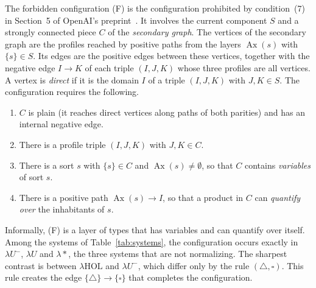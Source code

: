 \documentclass[10pt]{article}
\newcommand{\Ax}{\operatorname{Ax}}
\begin{document}
The forbidden configuration (F) is the configuration prohibited by condition~(7) in
Section~5 of OpenAI's preprint~\cite{OpenAI2026}. It involves the current component
$S$ and a strongly connected piece $C$ of the \emph{secondary graph}. The vertices of
the secondary graph are the profiles reached by positive paths from the layers
$\Ax(s)$ with $\{s\}\in S$. Its edges are the positive edges between these vertices,
together with the negative edge $I\to K$ of each triple $(I,J,K)$ whose three
profiles are all vertices. A vertex is \emph{direct} if it is the domain $I$ of a
triple $(I,J,K)$ with $J,K\in S$. The configuration requires the following.
\begin{enumerate}[label=(\alph*)]
\item $C$ is plain (it reaches direct vertices along paths of both parities) and
  has an internal negative edge.
\item There is a profile triple $(I,J,K)$ with $J,K\in C$.
\item There is a sort $s$ with $\{s\}\in C$ and $\Ax(s)\neq\emptyset$, so that $C$
  contains \emph{variables} of sort $s$.
\item There is a positive path $\Ax(s)\to I$, so that a product in $C$ can
  \emph{quantify over} the inhabitants of $s$.
\end{enumerate}
Informally, (F) is a layer of types that has variables and can quantify over
itself. Among the systems of Table~\ref{tab:systems}, the configuration occurs
exactly in $\lambda U^-$, $\lambda U$ and $\lambda{*}$, the three systems that are
not normalizing. The sharpest contrast is between $\lambda\mathrm{HOL}$ and
$\lambda U^-$, which differ only by the rule $(\triangle,\square)$. This rule
creates the edge $\{\triangle\}\to\{\square\}$ that completes the configuration.
\end{document}
